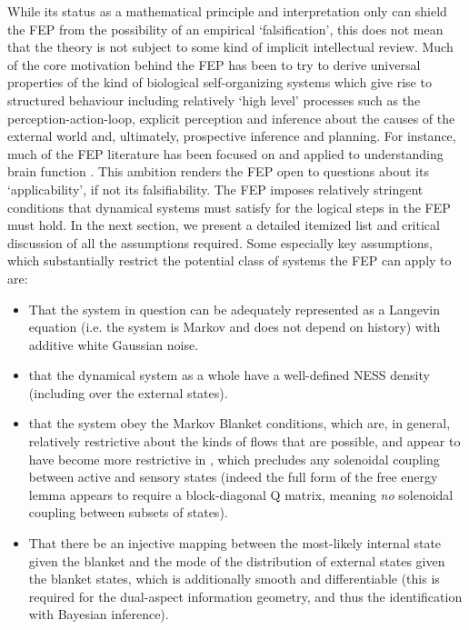 While its status as a mathematical principle and interpretation only can shield the FEP from the possibility of an empirical `falsification', this does not mean that the theory is not subject to some kind of implicit intellectual review. Much of the core motivation behind the FEP has been to try to derive universal properties of the kind of biological self-organizing systems which give rise to structured behaviour including relatively `high level' processes such as the perception-action-loop, explicit perception and inference about the causes of the external world and, ultimately, prospective inference and planning. For instance, much of the FEP literature has been focused on and applied to understanding brain function \citep{friston2008hierarchical,friston2015active,friston2017process}. This ambition renders the FEP open to questions about its `applicability', if not its falsifiability. The FEP imposes relatively stringent conditions that dynamical systems must satisfy for the logical steps in the FEP must hold. In the next section, we present a detailed itemized list and critical discussion of all the assumptions required. Some especially key assumptions, which substantially restrict the potential class of systems the FEP can apply to are:
\begin{itemize}
\item That the system in question can be adequately represented as a Langevin equation (i.e. the system is Markov and does not depend on history) with additive white Gaussian noise.
\item that the dynamical system as a whole have a well-defined NESS density (including over the external states).
\item that the system obey the Markov Blanket conditions, which are, in general, relatively restrictive about the kinds of flows that are possible, and appear to have become more restrictive in \citet{friston2020some}, which precludes any solenoidal coupling between active and sensory states (indeed the full form of the free energy lemma appears to require a block-diagonal Q matrix, meaning \emph{no} solenoidal coupling between subsets of states).
\item That there be an injective mapping between the most-likely internal state given the blanket and the mode of the distribution of external states given the blanket states, which is additionally smooth and differentiable (this is required for the dual-aspect information geometry, and thus the identification with Bayesian inference).
\end{itemize}
